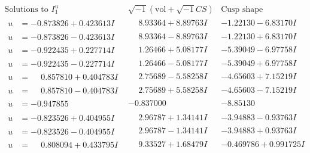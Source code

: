 \documentclass[1p]{elsarticle_modified}
\theoremstyle{definition}
\newcommand{\I}{\sqrt{-1}}
\begin{document}
$$\begin{array}{c|c|c}  
\text{Solutions to }I^u_{1}& \I (\text{vol} + \sqrt{-1}CS) & \text{Cusp shape}\\
 \hline 
\begin{aligned}
u &= -0.873826 + 0.423613 I\end{aligned}
 & \phantom{-}8.93364 + 8.89763 I & -1.22130 - 6.83170 I \\ \hline\begin{aligned}
u &= -0.873826 - 0.423613 I\end{aligned}
 & \phantom{-}8.93364 - 8.89763 I & -1.22130 + 6.83170 I \\ \hline\begin{aligned}
u &= -0.922435 + 0.227714 I\end{aligned}
 & \phantom{-}1.26466 + 5.08177 I & -5.39049 - 6.97758 I \\ \hline\begin{aligned}
u &= -0.922435 - 0.227714 I\end{aligned}
 & \phantom{-}1.26466 - 5.08177 I & -5.39049 + 6.97758 I \\ \hline\begin{aligned}
u &= \phantom{-}0.857810 + 0.404783 I\end{aligned}
 & \phantom{-}2.75689 - 5.58258 I & -4.65603 + 7.15219 I \\ \hline\begin{aligned}
u &= \phantom{-}0.857810 - 0.404783 I\end{aligned}
 & \phantom{-}2.75689 + 5.58258 I & -4.65603 - 7.15219 I \\ \hline\begin{aligned}
u &= -0.947855\phantom{ +0.000000I}\end{aligned}
 & -0.837000\phantom{ +0.000000I} & -8.85130\phantom{ +0.000000I} \\ \hline\begin{aligned}
u &= -0.823526 + 0.404955 I\end{aligned}
 & \phantom{-}2.96787 + 1.34141 I & -3.94883 - 0.93763 I \\ \hline\begin{aligned}
u &= -0.823526 - 0.404955 I\end{aligned}
 & \phantom{-}2.96787 - 1.34141 I & -3.94883 + 0.93763 I \\ \hline\begin{aligned}
u &= \phantom{-}0.808094 + 0.433795 I\end{aligned}
 & \phantom{-}9.33527 + 1.68479 I & -0.469786 + 0.991725 I \\ \hline\begin{aligned}

\end{aligned}
\end{array}$$
\end{document}
